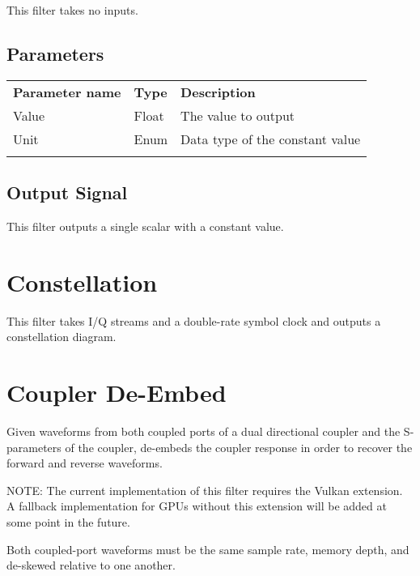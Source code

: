 This filter takes no inputs.

\subsection{Parameters}

\begin{tabularx}{16cm}{llX}
\thickhline
\textbf{Parameter name} & \textbf{Type} & \textbf{Description} \\
\thickhline
Value & Float & The value to output\\
\thinhline
Unit & Enum & Data type of the constant value\\
\thickhline
\end{tabularx}

\subsection{Output Signal}

This filter outputs a single scalar with a constant value.

\pagebreak
\section{Constellation}
\label{filter:constellation}

This filter takes I/Q streams and a double-rate symbol clock and outputs a constellation diagram.

\pagebreak
\section{Coupler De-Embed}
\label{filter:couplerdbed}

Given waveforms from both coupled ports of a dual directional coupler and the S-parameters of the coupler, de-embeds
the coupler response in order to recover the forward and reverse waveforms.

NOTE: The current implementation of this filter requires the  Vulkan extension. A
fallback implementation for GPUs without this extension will be added at some point in the future.

Both coupled-port waveforms must be the same sample rate, memory depth, and de-skewed relative to one another.

